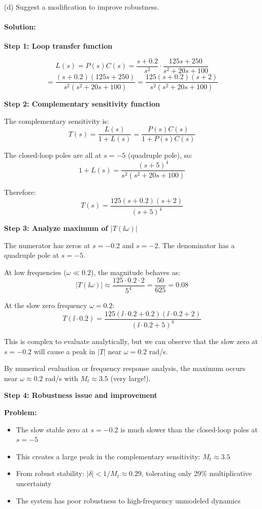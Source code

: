 \documentclass[11pt,a4paper]{article}
\begin{document}
(d) Suggest a modification to improve robustness.

\paragraph{Solution:}

\textbf{Step 1: Loop transfer function}

\[
L(s) = P(s)C(s) = \frac{s + 0.2}{s^2} \cdot \frac{125s + 250}{s^2 + 20s + 100}
\]
\[
= \frac{(s + 0.2)(125s + 250)}{s^2(s^2 + 20s + 100)} = \frac{125(s + 0.2)(s + 2)}{s^2(s^2 + 20s + 100)}
\]

\textbf{Step 2: Complementary sensitivity function}

The complementary sensitivity is:
\[
T(s) = \frac{L(s)}{1 + L(s)} = \frac{P(s)C(s)}{1 + P(s)C(s)}
\]

The closed-loop poles are all at $s = -5$ (quadruple pole), so:
\[
1 + L(s) = \frac{(s+5)^4}{s^2(s^2 + 20s + 100)}
\]

Therefore:
\[
T(s) = \frac{125(s + 0.2)(s + 2)}{(s+5)^4}
\]

\textbf{Step 3: Analyze maximum of $|T(\ii\omega)|$}

The numerator has zeros at $s = -0.2$ and $s = -2$.
The denominator has a quadruple pole at $s = -5$.

At low frequencies ($\omega \ll 0.2$), the magnitude behaves as:
\[
|T(\ii\omega)| \approx \frac{125 \cdot 0.2 \cdot 2}{5^4} = \frac{50}{625} = 0.08
\]

At the slow zero frequency $\omega = 0.2$:
\[
T(\ii \cdot 0.2) = \frac{125(\ii \cdot 0.2 + 0.2)(\ii \cdot 0.2 + 2)}{(\ii \cdot 0.2 + 5)^4}
\]

This is complex to evaluate analytically, but we can observe that the slow zero at $s = -0.2$ will cause a peak in $|T|$ near $\omega = 0.2$ rad/s.

By numerical evaluation or frequency response analysis, the maximum occurs near $\omega \approx 0.2$ rad/s with $M_t \approx 3.5$ (very large!).

\textbf{Step 4: Robustness issue and improvement}

\textbf{Problem:}
\begin{itemize}
\item The slow stable zero at $s = -0.2$ is much slower than the closed-loop poles at $s = -5$
\item This creates a large peak in the complementary sensitivity: $M_t \approx 3.5$
\item From robust stability: $|\delta| < 1/M_t \approx 0.29$, tolerating only 29\% multiplicative uncertainty
\item The system has poor robustness to high-frequency unmodeled dynamics
\end{itemize}
\end{document}
